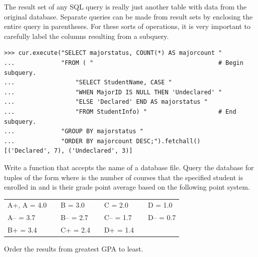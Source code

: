 The result set of any SQL query is really just another table with data from the original database.
Separate queries can be made from result sets by enclosing the entire query in parentheses.
For these sorts of operations, it is very important to carefully label the columns resulting from a subquery.

\begin{lstlisting}
>>> cur.execute("SELECT majorstatus, COUNT(*) AS majorcount "
...             "FROM ( "                                   # Begin subquery.
...                 "SELECT StudentName, CASE "
...                 "WHEN MajorID IS NULL THEN 'Undeclared' "
...                 "ELSE 'Declared' END AS majorstatus "
...                 "FROM StudentInfo) "                    # End subquery.
...             "GROUP BY majorstatus "
...             "ORDER BY majorcount DESC;").fetchall()
[('Declared', 7), ('Undeclared', 3)]
\end{lstlisting}

\begin{problem} %
Write a function that accepts the name of a database file.
Query the database for tuples of the form  where  is the number of courses that the specified student is enrolled in and  is their grade point average based on the following point system.

\begin{center}
\begin{tabular}{lclclcl}
A+, A   = 4.0 & & B   = 3.0 & & C   = 2.0 & & D   = 1.0 \\
    A-- = 3.7 & & B-- = 2.7 & & C-- = 1.7 & & D-- = 0.7 \\
    B+  = 3.4 & & C+  = 2.4 & & D+  = 1.4 & &
\end{tabular}
\end{center}
Order the results from greatest GPA to least.
\end{problem}

